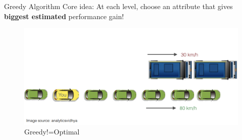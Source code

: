 \documentclass[usenames,dvipsnames]{beamer}
\begin{document}
\begin{frame}{Greedy Algorithm}
Core idea: At each level, choose an attribute that gives
\textbf{biggest estimated} performance gain!

\begin{figure}
	\centering
	\includegraphics[width=0.8\linewidth]{../assets/decision-trees/diagrams/gredy}
	\caption{Greedy!=Optimal}
	\label{fig:gredy}
\end{figure}

\end{frame}
\end{document}
